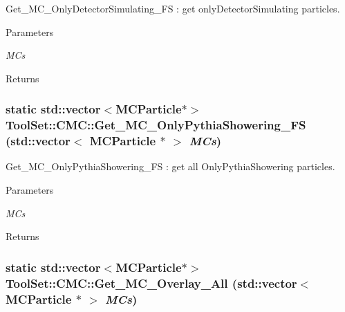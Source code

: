 Get\_\-MC\_\-OnlyDetectorSimulating\_\-FS : get onlyDetectorSimulating particles. 
\begin{DoxyParams}{Parameters}
\item[{\em MCs}]\end{DoxyParams}
\begin{DoxyReturn}{Returns}

\end{DoxyReturn}
\hypertarget{classToolSet_1_1CMC_aea4e69e23c45ca6ac4674ee90d56fc1c}{
\subsubsection[{Get\_\-MC\_\-OnlyPythiaShowering\_\-FS}]{\setlength{\rightskip}{0pt plus 5cm}static std::vector$<$MCParticle$\ast$$>$ ToolSet::CMC::Get\_\-MC\_\-OnlyPythiaShowering\_\-FS (std::vector$<$ MCParticle $\ast$ $>$ {\em MCs})}}
\label{classToolSet_1_1CMC_aea4e69e23c45ca6ac4674ee90d56fc1c}


Get\_\-MC\_\-OnlyPythiaShowering\_\-FS : get all OnlyPythiaShowering particles. 
\begin{DoxyParams}{Parameters}
\item[{\em MCs}]\end{DoxyParams}
\begin{DoxyReturn}{Returns}

\end{DoxyReturn}
\hypertarget{classToolSet_1_1CMC_a4bf55a4d64eeec4762f87ee7de91f585}{
\subsubsection[{Get\_\-MC\_\-Overlay\_\-All}]{\setlength{\rightskip}{0pt plus 5cm}static std::vector$<$MCParticle$\ast$$>$ ToolSet::CMC::Get\_\-MC\_\-Overlay\_\-All (std::vector$<$ MCParticle $\ast$ $>$ {\em MCs})}}
\label{classToolSet_1_1CMC_a4bf55a4d64eeec4762f87ee7de91f585}


